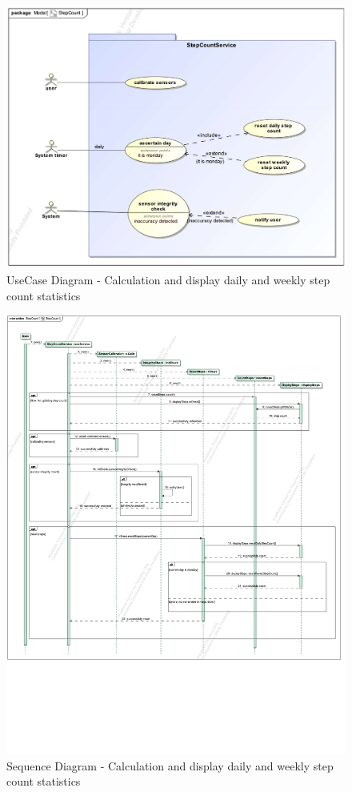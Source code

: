 \documentclass{article}
\begin{document}
		\clearpage
		\begin{figure}[h!]
			\centering
			\captionsetup{labelformat=empty}
			\caption{UseCase Diagram - Calculation and display daily and weekly step count statistics}
		    	\includegraphics[width=\textwidth, angle=0]{Marc/step/StepCountUseCase.pdf}
		\end{figure}
		\clearpage
		\begin{figure}[h!]
			\centering
			\captionsetup{labelformat=empty}
			\caption{Sequence Diagram - Calculation and display daily and weekly step count statistics}
		    	\includegraphics[width=\textwidth, angle=0]{Marc/step/StepCountSequence.pdf}
		\end{figure}
\end{document}
